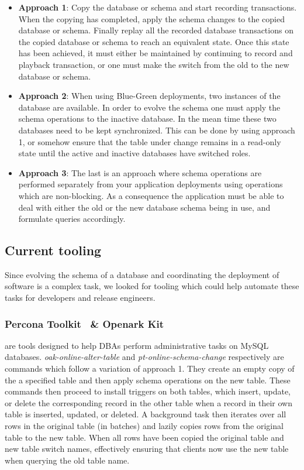\documentclass[conference]{IEEEtran}
\begin{document}
\begin{itemize}
  \item{\textbf{Approach 1}: Copy the database or schema and start recording transactions. When the copying has completed, apply the schema changes to the copied database or schema. Finally replay all the recorded database transactions on the copied database or schema to reach an equivalent state. Once this state has been achieved, it must either be maintained by continuing to record and playback transaction, or one must make the switch from the old to the new database or schema.}
  \item{\textbf{Approach 2}: When using Blue-Green deployments, two instances of the database are available. In order to evolve the schema one must apply the schema operations to the inactive database. In the mean time these two databases need to be kept synchronized. This can be done by using approach 1, or somehow ensure that the table under change remains in a read-only state until the active and inactive databases have switched roles.}
  \item{\textbf{Approach 3}: The last is an approach where schema operations are performed separately from your application deployments using operations which are non-blocking. As a consequence the application must be able to deal with either the old or the new database schema being in use, and formulate queries accordingly.}
\end{itemize}

\subsection{Current tooling} 
Since evolving the schema of a database and coordinating the deployment of software is a complex task, we looked for tooling which could help automate these tasks for developers and release engineers.

\subsubsection{Percona Toolkit~\cite{PerconaToolkit} \& Openark Kit~\cite{OpenarkKit}}
are tools designed to help DBAs perform administrative tasks on MySQL databases. \textit{oak-online-alter-table} and \textit{pt-online-schema-change} respectively are commands which follow a variation of approach 1. They create an empty copy of the a specified table and then apply schema operations on the new table. These commands then proceed to install triggers on both tables, which insert, update, or delete the corresponding record in the other table when a record in their own table is inserted, updated, or deleted. A background task then iterates over all rows in the original table (in batches) and lazily copies rows from the original table to the new table. When all rows have been copied the original table and new table switch names, effectively ensuring that clients now use the new table when querying the old table name.
\end{document}
